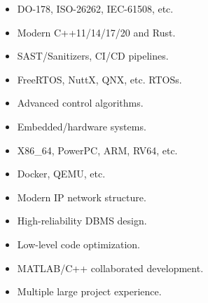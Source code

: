 \documentclass[10pt,a4paper,ragged2e,withhyper]{altacv}
\begin{document}
\begin{paracol}{2}
    \begin{itemize}
    \item DO-178, ISO-26262, IEC-61508, etc.
    \smallskip
    \item Modern C++11/14/17/20 and Rust.
    \smallskip
    \item SAST/Sanitizers, CI/CD pipelines.
    \smallskip
    \item FreeRTOS, NuttX, QNX, etc. RTOSs.
    \smallskip
    \item Advanced control algorithms.
    \smallskip
    \item Embedded/hardware systems.
    \smallskip
    \item X86\_64, PowerPC, ARM, RV64, etc.
    \smallskip
    \item Docker, QEMU, etc.
    \smallskip
    \item Modern IP network structure.
    \smallskip
    \item High-reliability DBMS design.
    \smallskip
    \item Low-level code optimization.
    \smallskip
    \item MATLAB/C++ collaborated development.
    \smallskip
    \item Multiple large project experience.
    \end{itemize}



\end{paracol}
\end{document}
